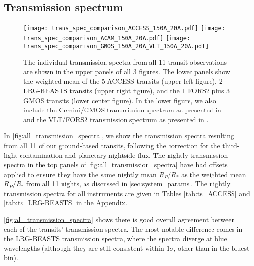 \documentclass[twocolumn]{aastex63}
\begin{document}
\begin{table*}
\begin{tabular}{lcccc}
\\ \hline


\end{tabular}
\end{table*}



\subsection{Transmission spectrum}
\label{sec:r_transmission_spectra}

\begin{figure*}
\centering
\texttt{[image: trans\_spec\_comparison\_ACCESS\_150A\_20A.pdf]}
\texttt{[image: trans\_spec\_comparison\_ACAM\_150A\_20A.pdf]}
\texttt{[image: trans\_spec\_comparison\_GMOS\_150A\_20A\_VLT\_150A\_20A.pdf]}
\caption{The individual transmission spectra from all 11 transit observations are shown in the upper panels of all 3 figures. The lower panels show the weighted mean of the 5 ACCESS transits (upper left figure), 2 LRG-BEASTS transits (upper right figure), and the 1 FORS2 plus 3 GMOS transits (lower center figure). In the lower figure, we also include the Gemini/GMOS transmission spectrum as presented in \protect\cite{Lendl2017} and the VLT/FORS2 transmission spectrum as presented in \protect\cite{Wilson2020}.}
\label{fig:all_transmission_spectra}
\end{figure*}

In \autoref{fig:all_transmission_spectra}, we show the transmission spectra resulting from all 11 of our ground-based transits, following the correction for the third-light contamination and planetary nightside flux. The nightly transmission spectra in the top panels of \autoref{fig:all_transmission_spectra} have had offsets applied to ensure they have the same nightly mean $R_P/R_*$ as the weighted mean $R_P/R_*$ from all 11 nights, as discussed in \autoref{sec:system_params}. The nightly transmission spectra for all instruments are given in Tables \ref{tab:ts_ACCESS} and \ref{tab:ts_LRG-BEASTS} in the Appendix.

\autoref{fig:all_transmission_spectra} shows there is good overall agreement between each of the transits' transmission spectra. The most notable difference comes in the LRG-BEASTS transmission spectra, where the spectra diverge at blue wavelengths (although they are still consistent within $1\sigma$, other than in the bluest bin). 
\end{document}
